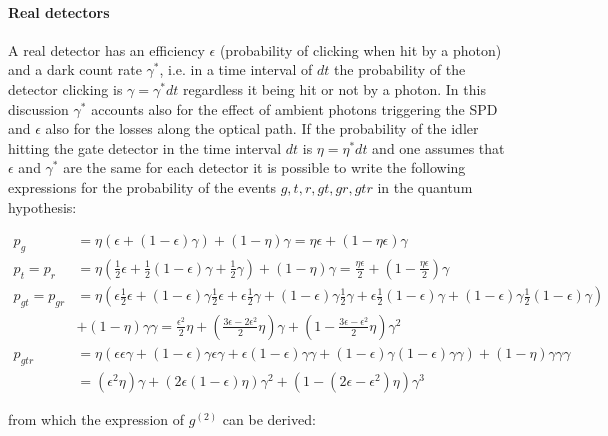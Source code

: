 \documentclass[a4paper, 11pt]{article}
\begin{document}
    \paragraph{Real detectors}
      A real detector has an efficiency $\epsilon$ (probability of clicking when hit by a photon) and a dark count rate $\gamma^*$, i.e. in a time interval of $dt$ the probability of the detector clicking is $\gamma = \gamma^* dt$ regardless it being hit or not by a photon. In this discussion $\gamma^*$ accounts also for the effect of ambient photons triggering the SPD and $\epsilon$ also for the losses along the optical path. If the probability of the idler hitting the gate detector in the time interval $dt$ is $\eta = \eta^* dt$ and one assumes that $\epsilon$ and $\gamma^*$ are the same for each detector it is possible to write the following expressions for the probability of the events $g,t,r,gt,gr,gtr$ in the quantum hypothesis:

      \begin{align*}
        p_g & = \eta \left(\epsilon + (1 - \epsilon)\gamma \right) + (1 - \eta)\gamma = \eta\epsilon + \left(1 - \eta\epsilon \right)\gamma \\
        p_t = p_r & = \eta \left(\frac{1}{2}\epsilon + \frac{1}{2}(1 - \epsilon)\gamma + \frac{1}{2}\gamma \right) + (1 - \eta)\gamma = \frac{\eta\epsilon}{2} + \left(1 - \frac{\eta\epsilon}{2} \right)\gamma \\
        p_{gt} = p_{gr} & = \eta \left(\epsilon \frac{1}{2}\epsilon + (1-\epsilon)\gamma\frac{1}{2}\epsilon + \epsilon\frac{1}{2}\gamma + (1-\epsilon)\gamma\frac{1}{2}\gamma + \epsilon\frac{1}{2}(1-\epsilon)\gamma + (1-\epsilon)\gamma\frac{1}{2}(1-\epsilon)\gamma \right) \\
        & + (1-\eta)\gamma\gamma = \frac{\epsilon^2}{2}\eta + \left(\frac{3\epsilon - 2\epsilon^2}{2}\eta \right)\gamma + \left(1 - \frac{3\epsilon - \epsilon^2}{2}\eta \right)\gamma^2 \\
        p_{gtr} & = \eta \left(\epsilon\epsilon\gamma + (1-\epsilon)\gamma\epsilon\gamma + \epsilon(1-\epsilon)\gamma\gamma + (1-\epsilon)\gamma(1-\epsilon)\gamma\gamma \right) + (1 - \eta)\gamma\gamma\gamma \\
        & = \left(\epsilon^2\eta \right)\gamma + \left(2\epsilon(1-\epsilon)\eta \right)\gamma^2 + \left(1 - (2\epsilon - \epsilon^2)\eta \right)\gamma^3
      \end{align*}

      from which the expression of $g^{(2)}$ can be derived:
\end{document}
